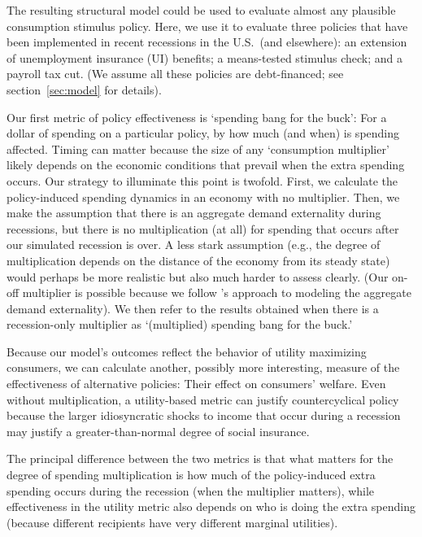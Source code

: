 \documentclass[../HAFiscal]{subfiles}
\begin{document}
The resulting structural model could be used to evaluate almost any plausible consumption stimulus policy.  Here, we use it to evaluate three policies that have been implemented in recent recessions in the U.S.\ (and elsewhere): an extension of unemployment insurance (UI) benefits; a means-tested stimulus check; and a payroll tax cut.  (We assume all these policies are debt-financed; see section~\ref{sec:model} for details).  %

Our first metric of policy effectiveness is `spending bang for the buck': For a dollar of spending on a particular policy, by how much (and when) is spending affected.  Timing can matter because the size of any `consumption multiplier' likely depends on the economic conditions that prevail when the extra spending occurs.  Our strategy to illuminate this point is twofold.  First, we calculate the policy-induced spending dynamics in an economy with no multiplier.  Then, we make the assumption that there is an aggregate demand externality during recessions, but there is no multiplication (at all) for spending that occurs after our simulated recession is over.  A less stark assumption (e.g., the degree of multiplication depends on the distance of the economy from its steady state) would perhaps be more realistic but also much harder to assess clearly.  (Our on-off multiplier is possible because we follow \cite{kmpHandbook2016}'s approach to modeling the aggregate demand externality).  We then refer to the results obtained when there is a recession-only multiplier as `(multiplied) spending bang for the buck.'  

Because our model's outcomes reflect the behavior of utility maximizing consumers, we can calculate another, possibly more interesting, measure of the effectiveness of alternative policies:  Their effect on consumers' welfare.  Even without multiplication, a utility-based metric can justify countercyclical policy because the larger idiosyncratic shocks to income that occur during a recession may justify a greater-than-normal degree of social insurance.

The principal difference between the two metrics is that what matters for the degree of spending multiplication is how much of the policy-induced extra spending occurs during the recession (when the multiplier matters), while effectiveness in the utility metric also depends on who is doing the extra spending (because different recipients have very different marginal utilities).
\end{document}
